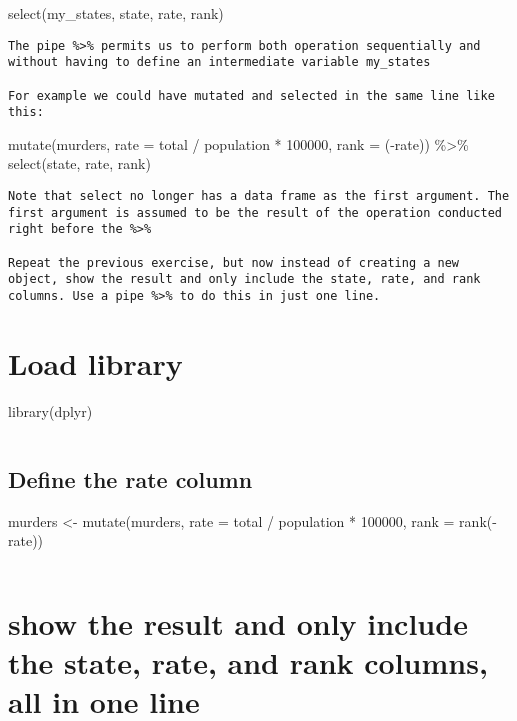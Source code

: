 \documentclass[
]{article}
\begin{document}
select(my\_states, state, rate, rank)

\begin{verbatim}
The pipe %>% permits us to perform both operation sequentially and without having to define an intermediate variable my_states

For example we could have mutated and selected in the same line like this:
\end{verbatim}

mutate(murders, rate = total / population * 100000, rank = (-rate))
\%\textgreater\% select(state, rate, rank)

\begin{verbatim}
Note that select no longer has a data frame as the first argument. The first argument is assumed to be the result of the operation conducted right before the %>%

Repeat the previous exercise, but now instead of creating a new object, show the result and only include the state, rate, and rank columns. Use a pipe %>% to do this in just one line.
\end{verbatim}

\hypertarget{load-library}{%
\section{Load library}\label{load-library}}

library(dplyr)

\begin{verbatim}
\end{verbatim}

\hypertarget{define-the-rate-column}{%
\subsection{Define the rate column}\label{define-the-rate-column}}

murders \textless- mutate(murders, rate = total / population * 100000,
rank = rank(-rate))

\begin{verbatim}
\end{verbatim}

\hypertarget{show-the-result-and-only-include-the-state-rate-and-rank-columns-all-in-one-line}{%
\section{show the result and only include the state, rate, and rank
columns, all in one
line}\label{show-the-result-and-only-include-the-state-rate-and-rank-columns-all-in-one-line}}
\end{document}
